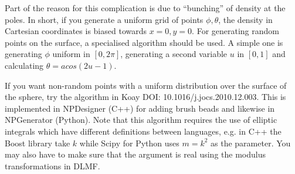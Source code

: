 \documentclass[10pt,a4paper,onecolumn]{report}
\begin{document}
 
 
Part of the reason for this complication is due to ``bunching'' of density at the poles. In short, if you generate a uniform grid of points $\phi,\theta$, the density in Cartesian coordinates is biased towards $x=0,y=0$. For generating random points on the surface, a specialised algorithm should be used. A simple one is generating $\phi$ uniform in $[0,2\pi]$, generating a second variable $u$ in $[0,1]$ and calculating $\theta =   acos (2 u-1)$.

If you want non-random points with a uniform distribution over the surface of the sphere, try the algorithm in Koay DOI: 10.1016/j.jocs.2010.12.003. This is implemented in NPDesigner (C++) for adding brush beads and likewise in NPGenerator (Python). Note that this algorithm requires the use of elliptic integrals which have different definitions between languages, e.g. in C++ the Boost library take $k$ while Scipy for Python uses $m=k^2$ as the parameter.  You may also have to make sure that the argument is real using the modulus transformations in DLMF. 
 
\end{document}
